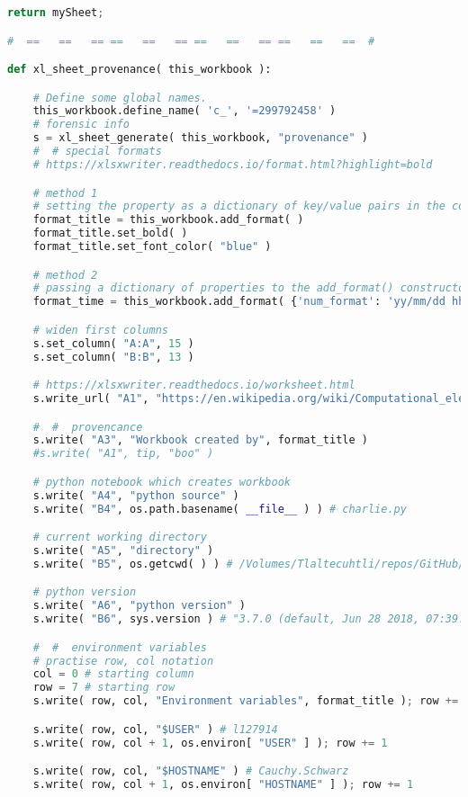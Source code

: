 {{\begin{lstlisting}[language=Python]
    return mySheet;

#  ==   ==   == ==   ==   == ==   ==   == ==   ==   ==  #

def xl_sheet_provenance( this_workbook ):

    # Define some global names.
    this_workbook.define_name( 'c_', '=299792458' )
    # forensic info
    s = xl_sheet_generate( this_workbook, "provenance" )
    #  # special formats
    # https://xlsxwriter.readthedocs.io/format.html?highlight=bold

    # method 1
    # setting the property as a dictionary of key/value pairs in the constructor
    format_title = this_workbook.add_format( )
    format_title.set_bold( )
    format_title.set_font_color( "blue" )

    # method 2
    # passing a dictionary of properties to the add_format() constructor
    format_time = this_workbook.add_format( {'num_format': 'yy/mm/dd hh:mm'} ) # https://xlsxwriter.readthedocs.io/working_with_dates_and_time.html

    # widen first columns
    s.set_column( "A:A", 15 )
    s.set_column( "B:B", 13 )

    # https://xlsxwriter.readthedocs.io/worksheet.html
    s.write_url( "A1", "https://en.wikipedia.org/wiki/Computational_electromagnetics", string = "Radar Cross Section Measurements" )

    #  #  provencance
    s.write( "A3", "Workbook created by", format_title )
    #s.write( "A1", tip, "boo" )

    # python notebook which creates workbook
    s.write( "A4", "python source" )
    s.write( "B4", os.path.basename( __file__ ) ) # charlie.py

    # current working directory
    s.write( "A5", "directory" )
    s.write( "B5", os.getcwd( ) ) # /Volumes/Tlaltecuhtli/repos/GitHub/topa-development/python/xlsx

    # python version
    s.write( "A6", "python version" )
    s.write( "B6", sys.version ) # "3.7.0 (default, Jun 28 2018, 07:39:16) [Clang 4.0.1 (tags/RELEASE_401/final)]"

    #  #  environment variables
    # practise row, col notation
    col = 0 # starting column
    row = 7 # starting row
    s.write( row, col, "Environment variables", format_title ); row += 1

    s.write( row, col, "$USER" ) # l127914
    s.write( row, col + 1, os.environ[ "USER" ] ); row += 1

    s.write( row, col, "$HOSTNAME" ) # Cauchy.Schwarz
    s.write( row, col + 1, os.environ[ "HOSTNAME" ] ); row += 1


\end{lstlisting}}}
